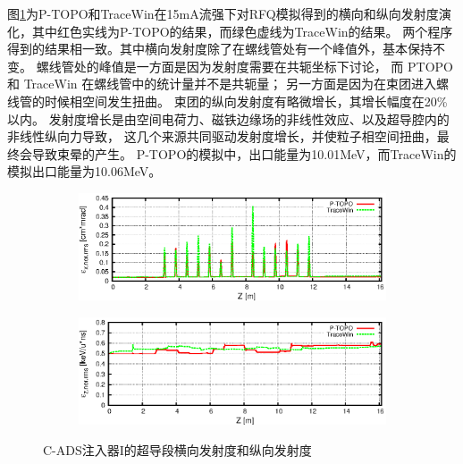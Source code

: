 图\ref{fig:ADS_SC_emit}为P-TOPO和TraceWin在15mA流强下对RFQ模拟得到的横向和纵向发射度演化，其中红色实线为P-TOPO的结果，而绿色虚线为TraceWin的结果。
两个程序得到的结果相一致。其中横向发射度除了在螺线管处有一个峰值外，基本保持不变。
螺线管处的峰值是一方面是因为发射度需要在共轭坐标下讨论， 而 PTOPO 和 TraceWin 在螺线管中的统计量并不是共轭量；
另一方面是因为在束团进入螺线管的时候相空间发生扭曲。
束团的纵向发射度有略微增长，其增长幅度在20\%以内。
发射度增长是由空间电荷力、磁铁边缘场的非线性效应、以及超导腔内的非线性纵向力导致，
这几个来源共同驱动发射度增长，并使粒子相空间扭曲，最终会导致束晕的产生。
P-TOPO的模拟中，出口能量为10.01MeV，而TraceWin的模拟出口能量为10.06MeV。
\begin{figure}[!htb]
    \centering
    \begin{subfigure}[b]{0.9\textwidth}
        \includegraphics[width=\textwidth]{Img/ADS_SC_emit1.eps}
    \end{subfigure}
    \begin{subfigure}[b]{0.9\textwidth}
        \includegraphics[width=\textwidth]{Img/ADS_SC_emit2.eps}
    \end{subfigure}
    \caption{C-ADS注入器I的超导段横向发射度和纵向发射度}\label{fig:ADS_SC_emit}
\end{figure}

